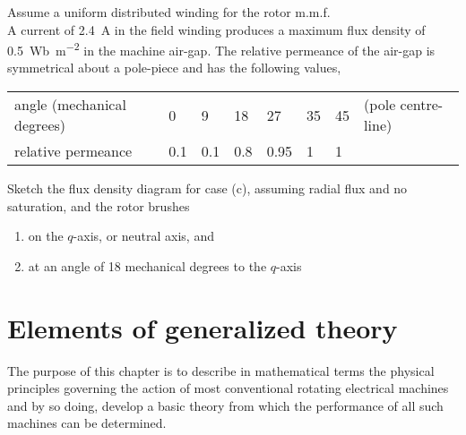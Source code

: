\documentclass[a4paper,numbers=noenddot,12pt]{scrbook}
\begin{document}
\begin{enumerate}[label={\thechapter.\arabic*},leftmargin=*]
\begin{enumerate}
        \end{enumerate}
        Assume a uniform distributed winding for the rotor m.m.f.\\
        A current of \SI{2.4}{\ampere} in the field winding produces a maximum flux density of \SI{0.5}{\weber\per\square\meter} in the machine air-gap. The relative permeance of the air-gap is symmetrical about a pole-piece and has the following values,\\
        \begin{tabular}{l m{0.25cm}p{0.25cm}p{0.25cm}p{0.25cm}p{0.25cm}p{0.25cm}l}
            angle (mechanical degrees)& 0  & 9  & 18  & 27   & 35  & 45 & (pole centre-line) \\
            relative permeance        &0.1 & 0.1& 0.8 & 0.95 & 1   & 1  & \\
        \end{tabular}

        Sketch the flux density diagram for case (c), assuming radial flux and no saturation, and the rotor brushes
        \begin{enumerate}[resume]
            \item on the $q$-axis, or neutral axis, and
            \item at an angle of 18 mechanical degrees to the $q$-axis
        \end{enumerate} 
\end{enumerate}
\endgroup

\chapter{Elements of generalized theory}
The purpose of this chapter is to describe in mathematical terms the physical principles governing the action of most conventional rotating electrical machines and by so doing, develop a basic theory from which the performance of all such machines can be determined. 
\end{document}
